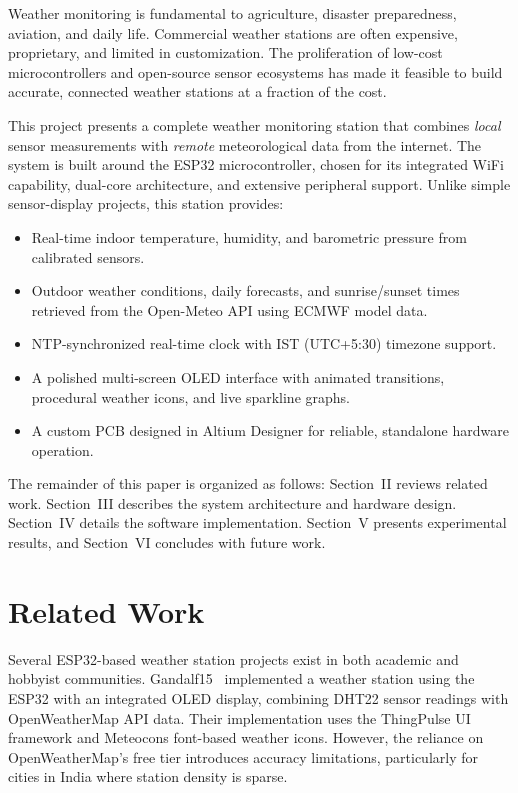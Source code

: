 \documentclass[conference]{IEEEtran}
\begin{document}
Weather monitoring is fundamental to agriculture, disaster preparedness, aviation, and daily life. Commercial weather stations are often expensive, proprietary, and limited in customization. The proliferation of low-cost microcontrollers and open-source sensor ecosystems has made it feasible to build accurate, connected weather stations at a fraction of the cost.

This project presents a complete weather monitoring station that combines \textit{local} sensor measurements with \textit{remote} meteorological data from the internet. The system is built around the ESP32 microcontroller, chosen for its integrated WiFi capability, dual-core architecture, and extensive peripheral support. Unlike simple sensor-display projects, this station provides:

\begin{itemize}
    \item Real-time indoor temperature, humidity, and barometric pressure from calibrated sensors.
    \item Outdoor weather conditions, daily forecasts, and sunrise/sunset times retrieved from the Open-Meteo API using ECMWF model data.
    \item NTP-synchronized real-time clock with IST (UTC+5:30) timezone support.
    \item A polished multi-screen OLED interface with animated transitions, procedural weather icons, and live sparkline graphs.
    \item A custom PCB designed in Altium Designer for reliable, standalone hardware operation.
\end{itemize}

The remainder of this paper is organized as follows: Section~II reviews related work. Section~III describes the system architecture and hardware design. Section~IV details the software implementation. Section~V presents experimental results, and Section~VI concludes with future work.

\section{Related Work}

Several ESP32-based weather station projects exist in both academic and hobbyist communities. Gandalf15~\cite{gandalf15} implemented a weather station using the ESP32 with an integrated OLED display, combining DHT22 sensor readings with OpenWeatherMap API data. Their implementation uses the ThingPulse UI framework and Meteocons font-based weather icons. However, the reliance on OpenWeatherMap's free tier introduces accuracy limitations, particularly for cities in India where station density is sparse.
\end{document}
